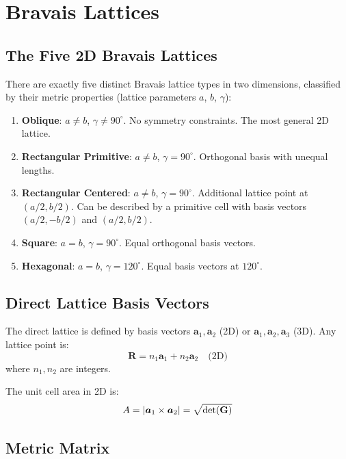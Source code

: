 \section{Bravais Lattices}

\subsection{The Five 2D Bravais Lattices}

There are exactly five distinct Bravais lattice types in two dimensions, classified by their metric properties (lattice parameters $a$, $b$, $\gamma$):

\begin{enumerate}
    \item \textbf{Oblique}: $a \neq b$, $\gamma \neq 90^\circ$. No symmetry constraints. The most general 2D lattice.
    \item \textbf{Rectangular Primitive}: $a \neq b$, $\gamma = 90^\circ$. Orthogonal basis with unequal lengths.
    \item \textbf{Rectangular Centered}: $a \neq b$, $\gamma = 90^\circ$. Additional lattice point at $(a/2, b/2)$. Can be described by a primitive cell with basis vectors $(a/2, -b/2)$ and $(a/2, b/2)$.
    \item \textbf{Square}: $a = b$, $\gamma = 90^\circ$. Equal orthogonal basis vectors.
    \item \textbf{Hexagonal}: $a = b$, $\gamma = 120^\circ$. Equal basis vectors at $120^\circ$.
\end{enumerate}

\subsection{Direct Lattice Basis Vectors}

The direct lattice is defined by basis vectors $\boldsymbol{a}_1, \boldsymbol{a}_2$ (2D) or $\boldsymbol{a}_1, \boldsymbol{a}_2, \boldsymbol{a}_3$ (3D). Any lattice point is:
\begin{equation}
    \boldsymbol{R} = n_1 \boldsymbol{a}_1 + n_2 \boldsymbol{a}_2 \quad \text{(2D)}
\end{equation}
where $n_1, n_2$ are integers.

The unit cell area in 2D is:
\begin{equation}
    A = |\boldsymbol{a}_1 \times \boldsymbol{a}_2| = \sqrt{\det(\mathbf{G})}
\end{equation}

\subsection{Metric Matrix}

